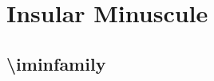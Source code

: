 \documentclass[danish,a4paper,11pt]{scrartcl}
\begin{document}
\section*{Insular Minuscule}
\subsection*{\textbackslash iminfamily}
\normalfont\iminfamily

\newpage
\normalfont\iminfamily

\end{document}
